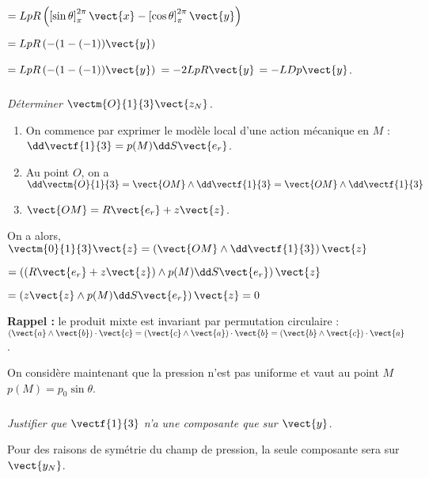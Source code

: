 \begin{multicols}{2}
\begin{multicols}{2}
\begin{corrige}
$=LpR\left( \left[ \sin \theta \right]^{2\pi}_{\pi}  \vect{x}-\left[\cos \theta \right]^{2\pi}_{\pi}   \vect{y}\right)$

$=LpR\left( -(1-(-1))   \vect{y}\right)$

$=LpR\left( -(1-(-1))   \vect{y}\right)$ $=-2LpR   \vect{y}$ $=-LDp   \vect{y}$.

\end{corrige}
\else
\fi


\subparagraph{}\textit{Déterminer $\vectm{O}{1}{3}\vect{z_N}$.}
\ifprof
\begin{corrige}
\begin{enumerate}
\item On commence par exprimer le modèle local d'une action mécanique en $M$ : $\dd \vectf{1}{3} = p(M) \dd S \vect{e_r}$.
\item Au point $O$, on a $\dd \vectm{O}{1}{3}=\vect{OM}\wedge \dd \vectf{1}{3} =\vect{OM}\wedge \dd \vectf{1}{3} $
\item $\vect{OM}=R\vect{e_r}+z\vect{z}$.
\end{enumerate}
On a alors, $ \vectm{0}{1}{3}\vect{z} =\left( \vect{OM}\wedge \dd \vectf{1}{3}\right) \vect{z}$

$ = \left( \left( R\vect{e_r}+z\vect{z} \right) \wedge  p(M) \dd S \vect{e_r}\right) \vect{z}$

$ = \left(z\vect{z} \wedge  p(M) \dd S \vect{e_r}\right) \vect{z} = 0$


\textbf{Rappel :} le produit mixte est invariant par permutation circulaire : $\left( \vect{a}\wedge \vect{b}\right)\cdot \vect{c} = \left( \vect{c}\wedge \vect{a}\right)\cdot \vect{b} = \left( \vect{b}\wedge \vect{c}\right)\cdot \vect{a}$.
\end{corrige}
\else
\fi

\vspace{.5cm}

On considère maintenant que la pression n'est pas uniforme et vaut au point $M$ $p(M)=p_0\sin\theta$.
\subparagraph{}\textit{Justifier que  $\vectf{1}{3}$ n'a une composante que sur $\vect{y}$.}
\ifprof
\begin{corrige}
Pour des raisons de symétrie du champ de pression, la seule composante sera sur $\vect{y_N}$.
\end{corrige}
\else
\fi



\end{multicols}
\end{multicols}
